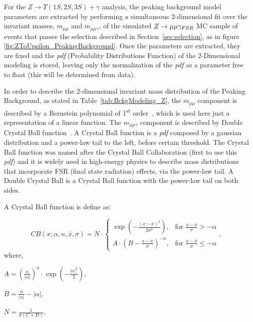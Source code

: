 For the $Z \rightarrow \Upsilon(1S,2S,3S) +\gamma$ analysis, the peaking background model parameters are extracted by performing a simultaneous 2-dimensional fit over the invariant masses, $m_{\mu\mu}$ and $m_{\mu\mu\gamma}$, of the simulated $Z \rightarrow \mu\mu\gamma_{\small{FSR}}$ MC sample of events that passes the selection described in Section~\ref{sec:selection}, as in figure \ref{fig:ZToUpsilon_PeakingBackground}. Once the parameters are extracted, they are fixed and the \textit{pdf} (Probability Distributions Function) of the 2-Dimensional modeling is stored, leaving only the normalization of the \textit{pdf} as a parameter free to float (this will be determined from data). 

In order to describe the 2-dimensional invariant mass distribution of the Peaking Background, as stated in Table~\ref{tab:BckgModeling_Z}, the $m_{\mu\mu}$ component is described by a Bernstein polynomial of 1\textsuperscript{st} order~\cite{Bernstein_pol}, which is used here just a representation of a linear function. The $m_{\mu\mu\gamma}$ component is described by Double Crystal Ball function~\cite{cb_function}. A Crystal Ball function is a \textit{pdf} composed by a gaussian distribution and a power-law tail to the left, before certain threshold. The Crystal Ball function was named after the Crystal Ball Collaboration (first to use this \textit{pdf}) and it is widely used in high-energy physics to describe mass distributions that incorporate FSR (final state radiation) effects, via the power-law tail. A Double Crystal Ball is a Crystal Ball function with the power-law tail on both sides.

A Crystal Ball function is define as:


\begin{equation}
\label{eqn:cb_function}
CB(x;\alpha,n,\bar x,\sigma) = N \cdot \begin{cases} \exp(- \frac{(x - \bar x)^2}{2 \sigma^2}), & \mbox{for }\frac{x - \bar x}{\sigma} > -\alpha \\
 A \cdot (B - \frac{x - \bar x}{\sigma})^{-n}, & \mbox{for }\frac{x - \bar x}{\sigma} \leqslant -\alpha \end{cases},
\end{equation}
where,

$A = \left(\frac{n}{\left| \alpha \right|}\right)^n \cdot \exp\left(- \frac {\left| \alpha \right|^2}{2}\right),$

$B = \frac{n}{\left| \alpha \right|}  - \left| \alpha \right|,$

$N = \frac{1}{\sigma (C + D)},$

